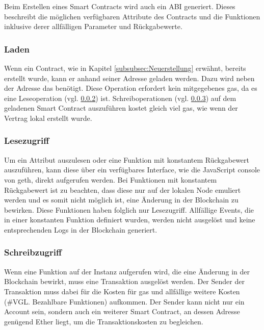 Beim Erstellen eines Smart Contracts wird auch ein \acrfull{ABI} generiert. Dieses beschreibt die möglichen verfügbaren Attribute des Contracts und die Funktionen inklusive derer allfälligen Parameter und Rückgabewerte.\cite{media.consensys.net/events-and-logs}

\subsubsection{Laden}
Wenn ein Contract, wie in Kapitel \ref{subsubsec:Neuerstellung} erwähnt, bereits erstellt wurde, kann er anhand seiner Adresse geladen werden.\cite[Solidity in Depth/Contracts/Creating Contracts]{solidity.readthedocs.io} Dazu wird neben der Adresse das  benötigt. Diese Operation erfordert kein mitgegebenes gas, da es eine Leseoperation (vgl. \ref{subsubsec:Lesezugriff}) ist. Schreiboperationen (vgl. \ref{subsubsec:Schreibzugriff}) auf dem geladenen Smart Contract auszuführen kostet gleich viel gas, wie wenn der Vertrag lokal erstellt wurde.

\subsubsection{Lesezugriff}
\label{subsubsec:Lesezugriff}
Um ein Attribut auszulesen oder eine Funktion mit konstantem Rückgabewert auszuführen, kann diese über ein verfügbares Interface, wie die JavaScript console von geth, direkt aufgerufen werden. Bei Funktionen mit konstantem Rückgabewert ist zu beachten, dass diese nur auf der lokalen Node emuliert werden und es somit nicht möglich ist, eine Änderung in der Blockchain zu bewirken.\cite{media.consensys.net/events-and-logs} Diese Funktionen haben folglich nur Lesezugriff. Allfällige Events, die in einer konstanten Funktion definiert wurden, werden nicht ausgelöst und keine entsprechenden Logs in der Blockchain generiert.

\subsubsection{Schreibzugriff}
\label{subsubsec:Schreibzugriff}
Wenn eine Funktion auf der Instanz aufgerufen wird, die eine Änderung in der Blockchain bewirkt, muss eine Transaktion ausgelöst werden. Der Sender der Transaktion muss dabei für die Kosten für gas und allfällige weitere Kosten (\#VGL. Bezahlbare Funktionen) aufkommen. Der Sender kann nicht nur ein Account sein, sondern auch ein weiterer Smart Contract, an dessen Adresse genügend Ether liegt, um die Transaktionskosten zu begleichen.

